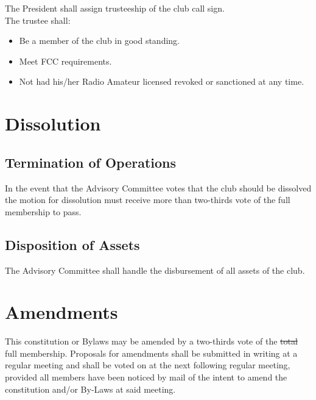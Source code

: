 \documentclass{report}
\begin{document}
\noindent The President shall assign trusteeship of the club call sign.\\

\noindent The trustee shall:
\begin{itemize}
\item Be a member of the club in good standing.

\item Meet FCC requirements.

\item Not had his/her Radio Amateur licensed revoked or sanctioned at any time.
\end{itemize}

\chapter{Dissolution}
\section{Termination of Operations}

In the event that the Advisory Committee votes that the club should be dissolved the motion for dissolution must receive more than two-thirds vote of the full membership to pass.

\section{Disposition of Assets}

The Advisory Committee shall handle the disbursement of all assets of the club.

\chapter{Amendments}
This constitution or Bylaws may be amended by a two-thirds vote of the {\color{red} \sout{total} full} membership. Proposals for amendments shall be submitted in writing at a regular meeting and shall be voted on at the next following regular meeting, provided all members have been noticed by mail of the intent to amend the constitution and/or By-Laws at said meeting.
\end{document}
